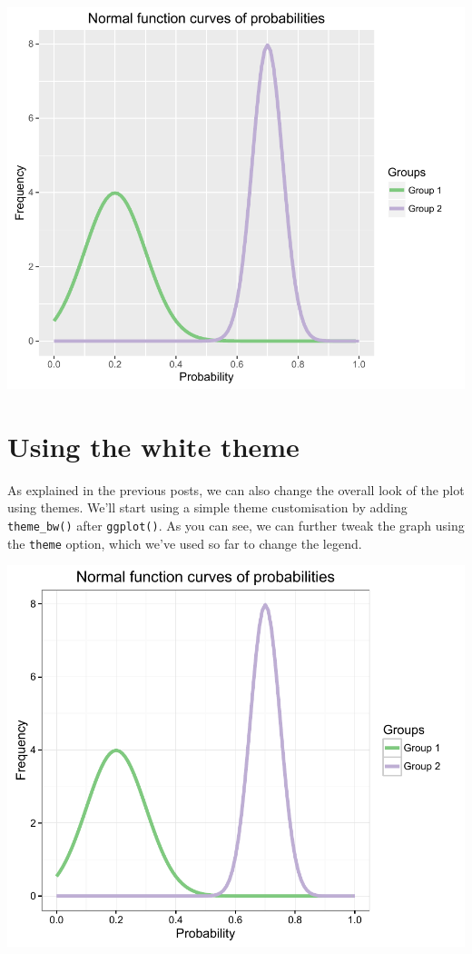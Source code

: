 \begin{center}\includegraphics[width=0.6\linewidth]{9_Function_Plots_pdf/function_12-1} \end{center}

\section{Using the white theme}\label{using-the-white-theme}

As explained in the previous posts, we can also change the overall look
of the plot using themes. We'll start using a simple theme customisation
by adding \texttt{theme\_bw()} after \texttt{ggplot()}. As you can see,
we can further tweak the graph using the \texttt{theme} option, which
we've used so far to change the legend.

\begin{Shaded}
\begin{Highlighting}[]
\StringTok{ }\StringTok{ }\NormalTok{()}
\end{Highlighting}
\end{Shaded}

\begin{center}\includegraphics[width=0.6\linewidth]{9_Function_Plots_pdf/function_13-1} \end{center}

